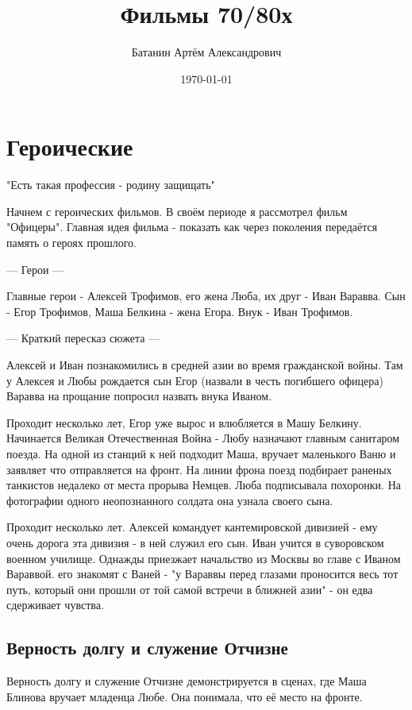\documentclass[a4paper,14pt]{article}
\title{ Фильмы 70/80х}
\author{Батанин Артём Александрович}
\date{\today}
\begin{document}
\maketitle





\section{Героические}
"Есть такая профессия - родину защищать"

Начнем с героических фильмов. В своём периоде я рассмотрел фильм "Офицеры".
Главная идея фильма - показать как через поколения передаётся память о героях прошлого.

--- Герои ---

Главные герои - Алексей Трофимов, его жена Люба, их друг - Иван Варавва.
Сын - Егор Трофимов, Маша Белкина - жена Егора. Внук - Иван Трофимов.


--- Краткий пересказ сюжета ---


Алексей и Иван познакомились в средней азии во время гражданской войны.
Там у Алексея и Любы рождается сын Егор (назвали в честь погибшего офицера)
Варавва на прощание попросил назвать внука Иваном.

Проходит несколько лет, Егор уже вырос и влюбляется в Машу Белкину.
Начинается Великая Отечественная Война - Любу назначают главным санитаром поезда.
На одной из станций к ней подходит Маша, вручает маленького Ваню и заявляет что отправляется на фронт.
На линии фрона поезд подбирает раненых танкистов недалеко от места прорыва Немцев.
Люба подписывала похоронки. На фотографии одного неопознанного солдата она узнала своего сына.

Проходит несколько лет. Алексей командует кантемировской дивизией - ему очень дорога эта дивизия - в ней служил его сын.
Иван учится в суворовском военном училище. Однажды приезжает начальство из Москвы во главе с Иваном Вараввой. его знакомят с Ваней - "у Вараввы перед глазами
проносится весь тот путь, который они прошли от той самой встречи в ближней азии" - он едва сдерживает чувства.

\subsection{Верность долгу и служение Отчизне}
Верность долгу и служение Отчизне демонстрируется в сценах, где Маша Блинова вручает младенца Любе. Она понимала, что её место на фронте.
\end{document}
